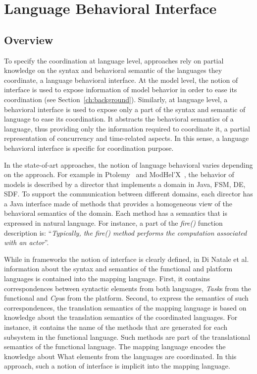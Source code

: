 \section{Language Behavioral Interface}
\subsection{Overview}
To specify the coordination at language level, approaches rely on partial knowledge on the syntax and behavioral semantic of the languages they coordinate, \ie a language behavioral interface. At the model level, the notion of interface is used to expose information of model behavior in order to ease its coordination (see Section~\ref{ch:background}). Similarly, at language level, a behavioral interface is used to expose only a part of the syntax and semantic of language to ease its coordination. It abstracts the behavioral semantics of a language, thus providing only the information required to coordinate it, \ie a partial representation of concurrency and time-related aspects. In this sense, a language behavioral interface is specific for coordination purpose.    

In the state-of-art approaches, the notion of language behavioral varies depending on the approach. For example in Ptolemy~\cite{ptoleframebib} and ModHel'X~\cite{modhelxbib}, the behavior of models is described by a director that implements a domain in Java, \eg FSM, DE, SDF. To support the communication between different domains, each director has a Java interface made of methods that provides a homogeneous view of the behavioral semantics of the domain. Each method has a semantics that is expressed in natural language. For instance, a part of the \emph{fire()} function description is: ``\emph{Typically, the fire() method performs the computation associated with an actor}''.
 	
While in frameworks the notion of interface is clearly defined, in Di Natale et al.~\cite{dinatale} information about the syntax and semantics of the functional and platform languages is contained into the mapping language. First, it contains correspondences between syntactic elements from both languages, \eg \emph{Task}s from the functional and \emph{Cpu}s from the platform. Second, to express the semantics of such correspondences, the translation semantics of the mapping language is based on knowledge about the translation semantics of the coordinated languages. For instance, it contains the name of the methods that are generated for each subsystem in the functional language. Such methods are part of the translational semantics of the functional language. The mapping language encodes the knowledge about What elements from the languages are coordinated. In this approach, such a notion of interface is implicit into the mapping language. 

